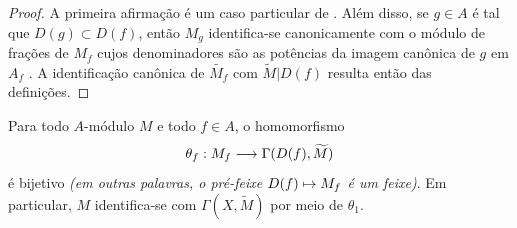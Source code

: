 \documentclass[oneside]{amsart}
\makeatletter
\newcommand{\ega@arrow}[2]{\mathchoice{#1}{#2}{#2}{#2}}
\let\ega@shortmapsto\mapsto
\renewcommand{\to}{\ega@arrow{\longrightarrow}{\rightarrow}}
\renewcommand{\mapsto}{\ega@arrow{\longmapsto}{\ega@shortmapsto}}
\let\EGAOriginalLabel\label
\renewcommand{\label}[1]{\phantomsection\EGAOriginalLabel{#1}}
\makeatother
\begin{document}
\begin{proof}
A primeira afirmação é um caso particular de .
Além disso, se $g\in A$ é tal que $D(g)\subset D(f)$, então $M_g$ identifica-se canonicamente com o módulo de frações de $M_f$ cujos denominadores são as potências da imagem canônica de $g$ em $A_f$ .
A identificação canônica de $\widetilde{M_f}$ com $\widetilde{M}|D(f)$ resulta então das definições.
\end{proof}

\begin{theorem}[1.3.7]
\label{I.1.3.7}
Para todo $A$-módulo $M$ e todo $f\in A$, o homomorfismo
\[
  \theta_f:M_f\to\Gamma(D(f),\widetilde{M})
\]
é bijetivo \emph{(em outras palavras, o pré-feixe $D(f)\mapsto M_f$ é um \emph{feixe})}.
Em particular, $M$ identifica-se com $\Gamma(X,\widetilde{M})$ por meio de $\theta_1$.
\end{theorem}
\end{document}
